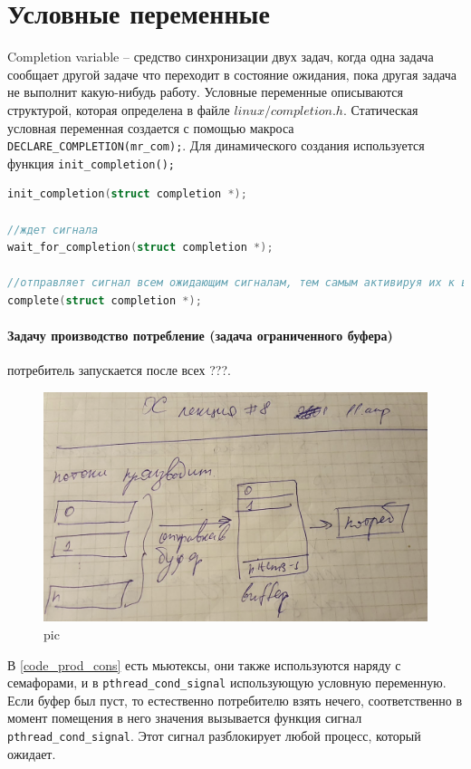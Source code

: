 \section{Условные переменные}

Completion variable – средство синхронизации двух задач, когда одна задача сообщает другой задаче что переходит в состояние ожидания, пока другая задача не выполнит какую-нибудь работу. Условные переменные описываются структурой, которая определена в файле $linux/completion.h$.
Статическая условная переменная создается с помощью макроса \verb|DECLARE_COMPLETION(mr_com);|.
Для динамического создания используется функция \verb|init_completion();| 

\begin{lstlisting}[language=c, caption=Функции для работы с условными переменными]
init_completion(struct completion *); 

//ждет сигнала
wait_for_completion(struct completion *);

//отправляет сигнал всем ожидающим сигналам, тем самым активируя их к выполненияю
complete(struct completion *);
\end{lstlisting}

\paragraph{Задачу производство потребление (задача ограниченного буфера)}

потребитель запускается после всех ???. 

\begin{figure}[H]
  \centering
  \includegraphics[width=\textwidth]{pic/1.png}
  \caption{pic}
\end{figure}

 

В \ref{code_prod_cons} есть мьютексы, они также используются наряду с семафорами, и в \verb|pthread_cond_signal| использующую условную переменную. Если буфер был пуст, то естественно потребителю взять нечего, соответственно в момент помещения в него значения вызывается функция сигнал \verb|pthread_cond_signal|. Этот сигнал разблокирует любой процесс, который ожидает.
